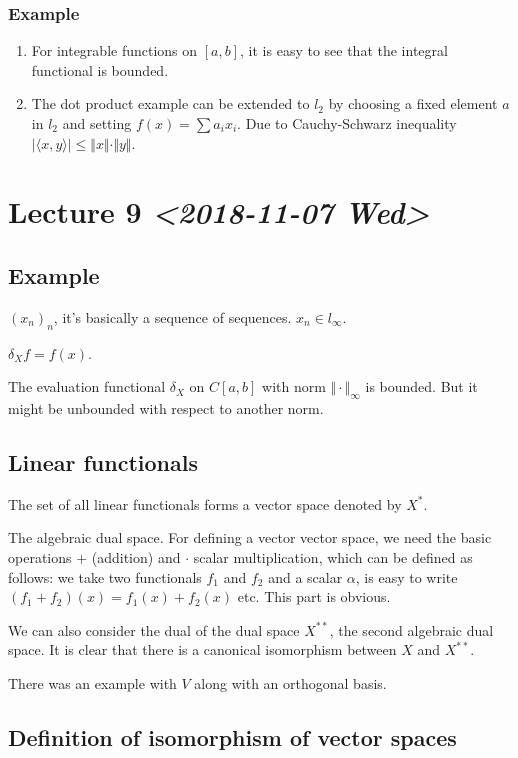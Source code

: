 \documentclass[11pt]{article}
\begin{document}
\subsubsection{Example}
\label{sec:org86ec16e}
\begin{enumerate}
\item For integrable functions on \([a, b]\), it is easy to see that the integral
functional is bounded.
\item The dot product example can be extended to \(l_2\) by choosing a fixed
element \(a\) in \(l_2\) and setting \(f(x) = \sum a_i x_i\). Due to
Cauchy-Schwarz inequality \(\vert \langle x, y\rangle\vert \le \Vert x
       \Vert \cdot \Vert y \Vert\).
\end{enumerate}
\section{Lecture 9 \textit{<2018-11-07 Wed>}}
\label{sec:orga437c83}
\subsection{Example}
\label{sec:org7e16801}
\((x_n)_n\), it's basically a sequence of sequences. \(x_n \in l_\infty\).

\(\delta_X f = f(x)\).

The evaluation functional \(\delta_X\) on \(C[a, b]\) with norm \(\Vert \cdot
   \Vert_\infty\) is bounded. But it might be unbounded with respect to another
norm.
\subsection{Linear functionals}
\label{sec:org31684ee}
The set of all linear functionals forms a vector space denoted by \(X^{*}\).

The algebraic dual space. For defining a vector vector space, we need the
basic operations \(+\) (addition) and \(\cdot\) scalar multiplication, which can be
defined as follows: we take two functionals \(f_1\) and \(f_2\) and a scalar
\(\alpha\), is easy to write \((f_1 + f_2)(x) = f_1(x) + f_2(x)\) etc. This part
is obvious.

We can also consider the dual of the dual space \(X^{**}\), the second
algebraic dual space. It is clear that there is a canonical isomorphism
between \(X\) and \(X^{**}\).

There was an example with \(V\) along with an orthogonal basis.
\subsection{Definition of isomorphism of vector spaces}
\label{sec:org9fac77d}
\end{document}
